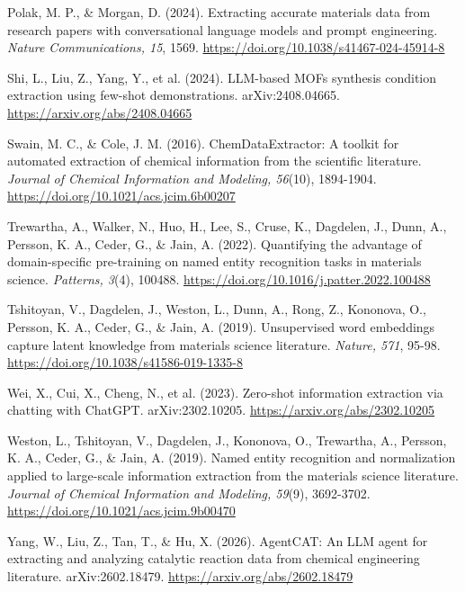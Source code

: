 \documentclass[11pt,a4paper,oneside]{report}
\begin{document}
Polak, M. P., \& Morgan, D. (2024). Extracting accurate materials data from research papers with conversational language models and prompt engineering. \emph{Nature Communications, 15}, 1569. \href{https://doi.org/10.1038/s41467-024-45914-8}{https://doi.org/10.1038/s41467-024-45914-8}

Shi, L., Liu, Z., Yang, Y., et al. (2024). LLM-based MOFs synthesis condition extraction using few-shot demonstrations. arXiv:2408.04665. \href{https://arxiv.org/abs/2408.04665}{https://arxiv.org/abs/2408.04665}

Swain, M. C., \& Cole, J. M. (2016). ChemDataExtractor: A toolkit for automated extraction of chemical information from the scientific literature. \emph{Journal of Chemical Information and Modeling, 56}(10), 1894-1904. \href{https://doi.org/10.1021/acs.jcim.6b00207}{https://doi.org/10.1021/acs.jcim.6b00207}

Trewartha, A., Walker, N., Huo, H., Lee, S., Cruse, K., Dagdelen, J., Dunn, A., Persson, K. A., Ceder, G., \& Jain, A. (2022). Quantifying the advantage of domain-specific pre-training on named entity recognition tasks in materials science. \emph{Patterns, 3}(4), 100488. \href{https://doi.org/10.1016/j.patter.2022.100488}{https://doi.org/10.1016/j.patter.2022.100488}

Tshitoyan, V., Dagdelen, J., Weston, L., Dunn, A., Rong, Z., Kononova, O., Persson, K. A., Ceder, G., \& Jain, A. (2019). Unsupervised word embeddings capture latent knowledge from materials science literature. \emph{Nature, 571}, 95-98. \href{https://doi.org/10.1038/s41586-019-1335-8}{https://doi.org/10.1038/s41586-019-1335-8}

Wei, X., Cui, X., Cheng, N., et al. (2023). Zero-shot information extraction via chatting with ChatGPT. arXiv:2302.10205. \href{https://arxiv.org/abs/2302.10205}{https://arxiv.org/abs/2302.10205}

Weston, L., Tshitoyan, V., Dagdelen, J., Kononova, O., Trewartha, A., Persson, K. A., Ceder, G., \& Jain, A. (2019). Named entity recognition and normalization applied to large-scale information extraction from the materials science literature. \emph{Journal of Chemical Information and Modeling, 59}(9), 3692-3702. \href{https://doi.org/10.1021/acs.jcim.9b00470}{https://doi.org/10.1021/acs.jcim.9b00470}

Yang, W., Liu, Z., Tan, T., \& Hu, X. (2026). AgentCAT: An LLM agent for extracting and analyzing catalytic reaction data from chemical engineering literature. arXiv:2602.18479. \href{https://arxiv.org/abs/2602.18479}{https://arxiv.org/abs/2602.18479}
\end{document}
